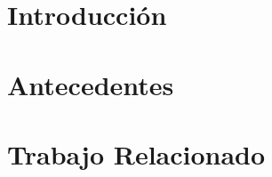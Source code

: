 \documentclass[12pt,spanish]{book}
\begin{document}


\chapter{Introducción}
%

\chapter{Antecedentes}

\label{ch:antecedentes}

\chapter{Trabajo Relacionado}



%

%

%
\end{document}
